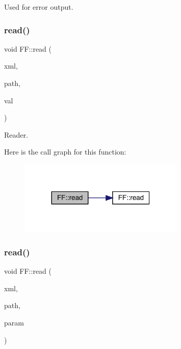 Used for error output. 

\mbox{\label{namespaceFF_a951fc6aa6ba4be7a0eb44c600fce48f0}} 
\subsubsection{\texorpdfstring{read()}{read()}\hspace{0.1cm}{\footnotesize\ttfamily [1/14]}}
{\footnotesize\ttfamily void F\+F\+::read (\begin{DoxyParamCaption}\item[{X\+M\+L\+Reader \&}]{xml,  }\item[{const std\+::string \&}]{path,  }\item[{\mbox{\hyperlink{structFF_1_1PiPf}{Pi\+Pf}} \&}]{val }\end{DoxyParamCaption})}



Reader. 

Here is the call graph for this function\+:\nopagebreak
\begin{figure}[H]
\begin{center}
\leavevmode
\includegraphics[width=224pt]{d5/da6/namespaceFF_a951fc6aa6ba4be7a0eb44c600fce48f0_cgraph}
\end{center}
\end{figure}
\mbox{\label{namespaceFF_acb4db5dbe27937736b4f2cbed9694c56}} 
\subsubsection{\texorpdfstring{read()}{read()}\hspace{0.1cm}{\footnotesize\ttfamily [2/14]}}
{\footnotesize\ttfamily void F\+F\+::read (\begin{DoxyParamCaption}\item[{X\+M\+L\+Reader \&}]{xml,  }\item[{const std\+::string \&}]{path,  }\item[{\mbox{\hyperlink{structFF_1_1KeyHadron1PtCorr__t}{Key\+Hadron1\+Pt\+Corr\+\_\+t}} \&}]{param }\end{DoxyParamCaption})}



